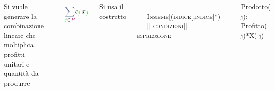\documentclass{beamer}
\newcommand{\noun}[1]{\textsc{#1}}
\def\lyxframeend{} %
\begin{document}
\lyxframeend{}
\begin{columns}%


\column{4.5cm}


{\small Si vuole generare la combinazione lineare che moltiplica profitti
unitari e quantit\`a da produrre}{\small \par}
\begin{columns}%
\bigskip{}

\end{columns}%

{\Large
 \begin{equation*}
 {\displaystyle
 {\color{magenta!23!green!40!blue!70} \sum_{{\color{green!70!black} j} {\color{black} \in} {\color{magenta} P}}}}
    c_{\color{green!70!black} j}\,x_{{\color{green!70!black} j}} 
  \end{equation*}
}


\column{6.5cm}


{\small Si usa il costrutto

 }\\
\ \ \  \noun{\small Insieme}{\small {[}(}\noun{\small indice}{\small {[},}\noun{\small indice}{\small {]}{*})\\
\ \ \ 
{[}| }\noun{\small condizioni}{\small {]]}\structure{{\small :}} }\noun{\small espressione}\\
{\small \structure{{\small );}}}{\small \par}
\begin{columns}%
\bigskip{}

\end{columns}%

{\small
    {\color{magenta} Prodotto}({\color{green!70!black} j}):
      Profitto({\color{green!70!black} j}){*}X({\color{green!70!black} j})
   \structure{);}
}

\end{columns}%
\end{document}
